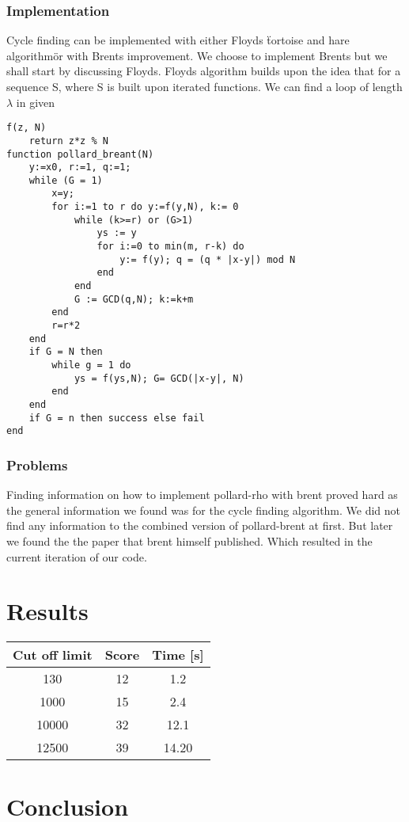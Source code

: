 \documentclass[a4paper, 12pt]{report}
\begin{document}
\subsection{Implementation}
Cycle finding can be implemented with either Floyds \"tortoise and hare algorithm\" or with Brents improvement. We choose to implement Brents but we shall start by discussing Floyds. Floyds algorithm builds upon the idea that for a sequence S, where S is built upon iterated functions. We can find a loop of length $\lambda$ in given

\begin{lstlisting}
f(z, N)
	return z*z % N
function pollard_breant(N)
	y:=x0, r:=1, q:=1;
	while (G = 1)
		x=y;
		for i:=1 to r do y:=f(y,N), k:= 0
			while (k>=r) or (G>1)
				ys := y
				for i:=0 to min(m, r-k) do
					y:= f(y); q = (q * |x-y|) mod N
				end
			end
			G := GCD(q,N); k:=k+m
		end
		r=r*2
	end
	if G = N then
		while g = 1 do
			ys = f(ys,N); G= GCD(|x-y|, N)
		end
	end
	if G = n then success else fail
end
\end{lstlisting}
\subsection{Problems}
Finding information on how to implement pollard-rho with brent proved hard as the general information we found was for the cycle finding algorithm. We did not find any information to the combined version of pollard-brent at first. But later we found the the paper that brent himself published. Which resulted in the current iteration of our code.
\chapter{Results}

\begin{tabular} {c c c}
Cut off limit 	&	 Score 	& Time [s] \\ \hline
130		&	12		& 1.2 \\
1000	&	15		& 2.4 \\
10000 	& 	32		& 12.1 \\
12500	&	39		&14.20 \\

\end{tabular}
\chapter{Conclusion}
\appendix
\end{document}

